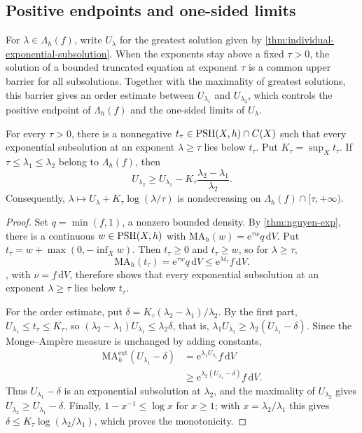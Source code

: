 \subsection{Positive endpoints and one-sided limits}

For $\lambda\in\Lambda_h(f)$, write $U_\lambda$ for the greatest solution given by \cref{thm:individual-exponential-subsolution}. When the exponents stay above a fixed $\tau>0$, the solution of a bounded truncated equation at exponent $\tau$ is a common upper barrier for all subsolutions. Together with the maximality of greatest solutions, this barrier gives an order estimate between $U_{\lambda_1}$ and $U_{\lambda_2}$, which controls the positive endpoint of $\Lambda_h(f)$ and the one-sided limits of $U_\lambda$.

\begin{lemma}\label{lem:positive-exponent-uniform-upper-barrier}
For every $\tau>0$, there is a nonnegative $t_\tau\in\mathrm{PSH}(X,h)\cap C(X)$ such that every exponential subsolution at an exponent $\lambda\geq\tau$ lies below $t_\tau$. Put $K_\tau=\sup_Xt_\tau$. If $\tau\leq\lambda_1\leq\lambda_2$ belong to $\Lambda_h(f)$, then
\[
 U_{\lambda_2}\geq U_{\lambda_1}
             -K_\tau\frac{\lambda_2-\lambda_1}{\lambda_2}.
\]
Consequently, $\lambda\mapsto U_\lambda+K_\tau\log(\lambda/\tau)$ is nondecreasing on $\Lambda_h(f)\cap[\tau,+\infty)$.
\end{lemma}
\begin{proof}
Set $q=\min(f,1)$, a nonzero bounded density. By \cref{thm:nguyen-exp}, there is a continuous $w\in\mathrm{PSH}(X,h)$ with $\mathrm{MA}_h(w)=\mathrm e^{\tau w}q\,\mathrm dV$. Put $t_\tau=w+\max(0,-\inf_Xw)$. Then $t_\tau\geq0$ and $t_\tau\geq w$, so for $\lambda\geq\tau$,
\[
 \mathrm{MA}_h(t_\tau)=\mathrm e^{\tau w}q\,\mathrm dV
       \leq\mathrm e^{\lambda t_\tau}f\,\mathrm dV.
\]
, with $\nu=f\,\mathrm dV$, therefore shows that every exponential subsolution at an exponent $\lambda\geq\tau$ lies below $t_\tau$.

For the order estimate, put $\delta=K_\tau(\lambda_2-\lambda_1)/\lambda_2$. By the first part, $U_{\lambda_1}\leq t_\tau\leq K_\tau$, so $(\lambda_2-\lambda_1)U_{\lambda_1}\leq\lambda_2\delta$, that is, $\lambda_1U_{\lambda_1}\geq\lambda_2(U_{\lambda_1}-\delta)$. Since the Monge--Amp\`ere measure is unchanged by adding constants,
\begin{align*}
 \mathrm{MA}^{\mathrm{ext}}_h(U_{\lambda_1}-\delta)
   &=\mathrm e^{\lambda_1U_{\lambda_1}}f\,\mathrm dV\\
   &\geq\mathrm e^{\lambda_2(U_{\lambda_1}-\delta)}f\,\mathrm dV.
\end{align*}
Thus $U_{\lambda_1}-\delta$ is an exponential subsolution at $\lambda_2$, and the maximality of $U_{\lambda_2}$ gives $U_{\lambda_2}\geq U_{\lambda_1}-\delta$. Finally, $1-x^{-1}\leq\log x$ for $x\geq1$; with $x=\lambda_2/\lambda_1$ this gives $\delta\leq K_\tau\log(\lambda_2/\lambda_1)$, which proves the monotonicity.
\end{proof}

